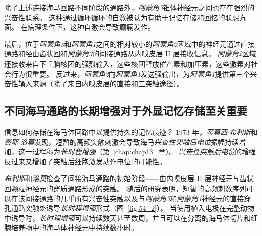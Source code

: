 除了上述连接海马回路不同阶段的通路外，\textit{阿蒙角3}锥体神经元之间也存在强烈的兴奋性联系。
这种通过循环循环的自激被认为有助于记忆存储和回忆的联想方面。
在病理条件下，这种自激会导致癫痫发作。


最后，位于\textit{阿蒙角3}和\textit{阿蒙角1}之间的相对较小的\textit{阿蒙角2}区域中的神经元通过直接通路和经由齿状回和\textit{阿蒙角3}的间接通路从内嗅皮层 II 层接收信息。
\textit{阿蒙角2}区域还接收来自下丘脑核团的强烈输入，这些核团释放催产素和加压素，这些激素对社会行为很重要。
反过来，\textit{阿蒙角2}向\textit{阿蒙角1}发送强输出，为\textit{阿蒙角1}提供第三个兴奋性输入来源（除了来自内嗅皮层的直接和三突触途径）。



\subsection{不同海马通路的长期增强对于外显记忆存储至关重要}

信息如何存储在海马体回路中以提供持久的记忆痕迹？
1973 年，\textit{蒂莫西$\cdot$布利斯}和\textit{泰耶$\cdot$洛莫}发现，短暂的高频突触刺激会导致海马\textit{兴奋性突触后电位}振幅持续增加，这一过程称为\textit{长时程增强}（第~\ref{chap:chap13}~章）。
\textit{兴奋性突触后电位}的增强反过来又增加了突触后细胞激发动作电位的可能性。


\textit{布利斯}和\textit{洛莫}检查了间接海马通路的初始阶段——由内嗅皮层 II 层神经元与齿状回颗粒神经元的穿质通路形成的突触。
随后的研究表明，短暂的高频刺激序列可以在该间接通路的几乎所有兴奋性突触以及与\textit{阿蒙角3}和\textit{阿蒙角1}神经元的直接穿孔通路突触处诱导\textit{长时程增强}形式（图~\ref{fig:54_2}）。
当使用植入电极在完整动物中诱导时，\textit{长时程增强}可以持续数天甚至数周，并且可以在分离的海马体切片和细胞培养物中的海马体神经元中持续数小时。


